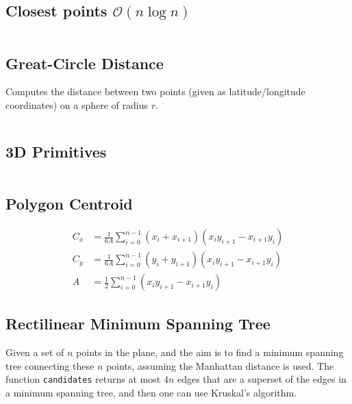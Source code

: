 \documentclass[8pt,a4paper,landscape,oneside]{amsart}
\newcommand{\code}[1]{\inputminted[fontsize=\normalsize,baselinestretch=1,breaklines,tabsize=2]{cpp}{code/#1}}
\begin{document}
\begin{multicols*}{3}
\subsection{Closest points $\mathcal{O}(n \log n)$}
\code{geometry/closest_points.cpp}

\subsection{Great-Circle Distance}
        Computes the distance between two points (given as latitude/longitude
        coordinates) on a sphere of radius $r$.
        \code{geometry/gc_distance.cpp}

\subsection{3D Primitives}
        \code{geometry/primitives3d.cpp}

\subsection{Polygon Centroid}
        \begin{align*}
          C_x &= \frac{1}{6A}\sum_{i=0}^{n-1}(x_i+x_{i+1})(x_iy_{i+1} - x_{i+1}y_i) \\
          C_y &= \frac{1}{6A}\sum_{i=0}^{n-1}(y_i+y_{i+1})(x_iy_{i+1} - x_{i+1}y_i) \\
          A &= \frac12\sum_{i=0}^{n-1}(x_iy_{i+1}-x_{i+1}y_i)
        \end{align*}

\subsection{Rectilinear Minimum Spanning Tree}
        Given a set of $n$ points in the plane, and the aim is to find a
        minimum spanning tree connecting these $n$ points, assuming the
        Manhattan distance is used. The function \texttt{candidates} returns at
        most $4n$ edges that are a superset of the edges in a minimum spanning
        tree, and then one can use Kruskal's algorithm.
        \code{geometry/rmst.cpp}


\end{multicols*}
\end{document}
